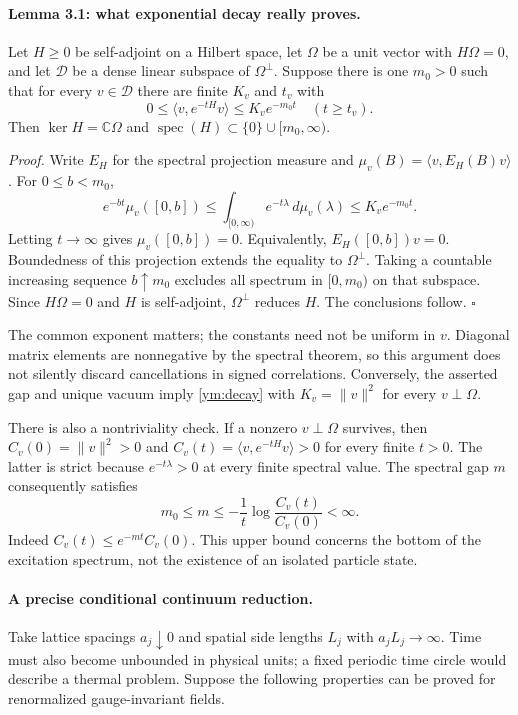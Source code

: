 \documentclass[11pt]{article}
\begin{document}
\paragraph{Lemma 3.1: what exponential decay really proves.}
Let $H\geq0$ be self-adjoint on a Hilbert space, let $\Omega$ be a unit vector
 with $H\Omega=0$, and let $\mathcal D$ be a dense linear subspace of
 $\Omega^\perp$. Suppose there is one $m_0>0$ such that for every
 $v\in\mathcal D$ there are finite $K_v$ and $t_v$ with
\begin{equation}\label{ym:decay}
 0\leq\langle v,e^{-tH}v\rangle\leq K_v e^{-m_0t}
 \quad(t\geq t_v).
\end{equation}
Then $\ker H=\mathbb C\Omega$ and
 $\operatorname{spec}(H)\subset\{0\}\cup[m_0,\infty)$.

\emph{Proof.}
Write $E_H$ for the spectral projection measure and
 $\mu_v(B)=\langle v,E_H(B)v\rangle$. For $0\leq b<m_0$,
\[
 e^{-bt}\mu_v([0,b])
 \leq\int_{[0,\infty)}e^{-t\lambda}\,d\mu_v(\lambda)
 \leq K_v e^{-m_0t}.
\]
Letting $t\to\infty$ gives $\mu_v([0,b])=0$. Equivalently,
 $E_H([0,b])v=0$. Boundedness of this projection extends the equality to
 $\Omega^\perp$. Taking a countable increasing sequence $b\uparrow m_0$
 excludes all spectrum in $[0,m_0)$ on that subspace. Since $H\Omega=0$
 and $H$ is self-adjoint, $\Omega^\perp$ reduces $H$. The conclusions follow.
\hfill$\square$

The common exponent matters; the constants need not be uniform in $v$.
 Diagonal matrix elements are nonnegative by the spectral theorem, so this
 argument does not silently discard cancellations in signed correlations.
 Conversely, the asserted gap and unique vacuum imply
 \eqref{ym:decay} with $K_v=\|v\|^2$ for every $v\perp\Omega$.

There is also a nontriviality check. If a nonzero $v\perp\Omega$ survives,
 then $C_v(0)=\|v\|^2>0$ and $C_v(t)=\langle v,e^{-tH}v\rangle>0$ for every
 finite $t>0$. The latter is strict because $e^{-t\lambda}>0$ at every finite
 spectral value. The spectral gap $m$ consequently satisfies
\begin{equation}\label{ym:upper}
 m_0\leq m\leq-\frac1t\log\frac{C_v(t)}{C_v(0)}<\infty.
\end{equation}
Indeed $C_v(t)\leq e^{-mt}C_v(0)$. This upper bound concerns the bottom of
 the excitation spectrum, not the existence of an isolated particle state.

\paragraph{A precise conditional continuum reduction.}
Take lattice spacings $a_j\downarrow0$ and spatial side lengths $L_j$ with
 $a_jL_j\to\infty$. Time must also become unbounded in physical units;
 a fixed periodic time circle would describe a thermal problem. Suppose the
 following properties can be proved for renormalized gauge-invariant fields.
\end{document}

